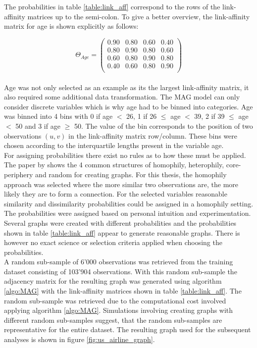   \noindent The probabilities in table \ref{table:link_aff} correspond to the
  rows of the link-affinity matrices up to the semi-colon. To give a better
  overview, the link-affinity matrix for age is shown explicitly as follows:

  \[ \Theta_{Age} = 
	\begin{pmatrix}
		0.90 & 0.80 & 0.60 & 0.40 \\
        0.80 & 0.90 & 0.80 & 0.60 \\
        0.60 & 0.80 & 0.90 & 0.80 \\
        0.40 & 0.60 & 0.80 & 0.90 \\
	\end{pmatrix}
  \] \\

  \noindent Age was not only selected as an example as its the largest
  link-affinity matrix, it also required some additional data transformation.
  The MAG model can only consider discrete variables which is why age had to be
  binned into categories. Age was binned into 4 bins with 0 if age $<$ 26,
  1 if 26 $\leqslant$ age $<$ 39, 2 if 39 $\leqslant$ age $<$ 50 and 3 if age
  $\geqslant$ 50. The value of the bin corresponds to the position of two
  observations $(u,v)$ in the link-affinity matrix row/column. These bins were
  chosen according to the interquartile lengths present in the variable age. \\

  \noindent For assigning probabilities there exist no rules as to how these
  must be applied. The paper by \cite{kim2012multiplicative} shows the 4 common
  structures of homophily, heterophily, core-periphery and random for creating
  graphs. For this thesis, the homophily approach was selected where the more
  similar two observations are, the more likely they are to form a connection.
  For the selected variables reasonable similarity and dissimilarity 
  probabilities could be assigned in a homophily setting. The probabilities were
  assigned based on personal intuition and experimentation. Several graphs were
  created with different probabilities and the probabilities shown in table
  \ref{table:link_aff} appear to generate reasonable graphs. There is however
  no exact science or selection criteria applied when choosing the
  probabilities. \\

  \noindent A random sub-sample of 6'000 observations was retrieved from the
  training dataset consisting of 103’904 observations. With this random
  sub-sample the adjacency matrix for the resulting graph was generated using
  algorithm \ref{algo:MAG} with the link-affinity matrices shown in table
  \ref{table:link_aff}. The random sub-sample was retrieved due to the
  computational cost involved applying algorithm \ref{algo:MAG}. Simulations
  involving creating graphs with different random sub-samples suggest, that the
  random sub-samples are representative for the entire dataset. The resulting
  graph used for the subsequent analyses is shown in figure
  \ref{fig:us_airline_graph}.

